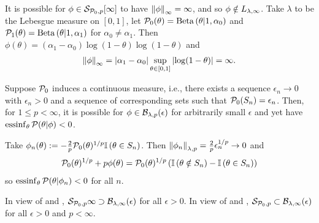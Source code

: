 \begin{ex}
%
It is possible for $\phi \in \mathcal{S}_{\mathcal{P}_{0},p}[\infty]$ to have $\left\Vert\phi\right\Vert_{\infty} =
\infty$, and so $\phi \notin {L_{\lambda,\infty}}$.  Take $\lambda$ to be the
Lebesgue measure on $[0,1]$, let $\mathcal{P}_{0}(\theta) = \mathrm{Beta}\left(\theta \vert 1,
\alpha_0\right)$ and $\mathcal{P}_{1}(\theta) = \mathrm{Beta}\left(\theta \vert 1, \alpha_1\right)$ for
$\alpha_0 \ne \alpha_1$.  Then $\phi(\theta) = (\alpha_1 - \alpha_0) \log(1 -
\theta) \log(1 - \theta)$
%
and
%
\begin{align*}
%
\norminf{\phi} =
    \abs{\alpha_1 - \alpha_0} \sup_{\theta \in [0,1]} \abs{\log(1 - \theta)} =
    \infty.
%
\end{align*}
%
\end{ex}

\begin{ex}
%
Suppose $\mathcal{P}_{0}$ induces a continuous measure, i.e., there exists a sequence
$\epsilon_n \rightarrow 0$ with $\epsilon_n > 0$ and a sequence of corresponding
sets such that $\mathcal{P}_{0}(S_n) = \epsilon_n$.  Then, for $1 \le p < \infty$, it is
possible for $\phi \in \mathcal{B}_{\lambda,p}(\epsilon)$ for arbitrarily small
$\epsilon$ and yet have $\operatorname*{\mathrm{essinf}}_{\theta} \mathcal{P}(\theta \vert \phi) < 0$.

Take
%
%
$\phi_n(\theta) := - \frac{2}{p} \mathcal{P}_{0}(\theta)^{1/p} \mathbb{I}\left(\theta \in S_n\right)$.
%
%
Then $\left\Vert\phi_n\right\Vert_{\lambda, p} = \frac{2}{p} \epsilon_n^{1/p} \rightarrow 0$
and
%
\begin{align*}
%
\pbase(\theta)^{1/p} + p \phi(\theta) ={}
\pbase(\theta)^{1/p}
\left(\ind{\theta \notin S_n} - \ind{\theta \in S_n} \right)
%
\end{align*}
%
so $\operatorname*{\mathrm{essinf}}_\theta \mathcal{P}(\theta \vert \phi_n) < 0$ for all $n$.
%
\end{ex}

In view of  and ,
$\mathcal{S}_{\mathcal{P}_{0},p}{\infty} \supset \mathcal{B}_{\lambda,\infty}(\epsilon)$ for all $\epsilon >
0$. In view of  and , $\mathcal{S}_{\mathcal{P}_{0},p}
\subset \mathcal{B}_{\lambda,\infty}(\epsilon)$ for all $\epsilon > 0$ and $p <
\infty$.


